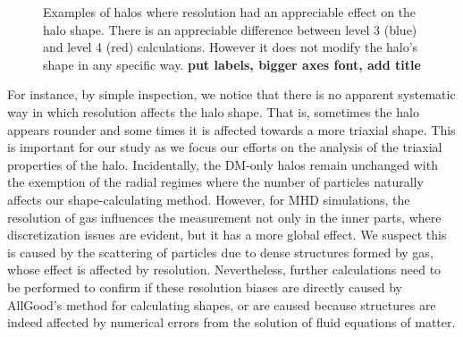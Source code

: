\begin{figure}[!ht]
  \centering
  \hfill
  \caption{Examples of halos where resolution had an appreciable effect on the halo shape. There is an appreciable difference between level 3 (blue) and level 4 (red) calculations. However it does not modify the halo's shape in any specific way. \textbf{put labels, bigger axes font, add title} }
\end{figure}


For instance, by simple inspection, we notice that there is no apparent systematic way in which resolution affects the halo shape. That is, sometimes the halo appears rounder and some times it is affected towards a more triaxial shape. This is important for our study as we focus our efforts on the analysis of the triaxial properties of the halo. Incidentally, the DM-only halos remain unchanged with the exemption of the radial regimes where the number of particles naturally affects our shape-calculating method. However, for MHD simulations, the resolution of gas influences the measurement not only in the inner parts, where discretization issues are evident, but it has a more global effect. We suspect this is caused by the scattering of particles due to dense structures formed by gas, whose effect is affected by resolution. Nevertheless, further calculations need to be performed to confirm if these resolution biases are directly caused by AllGood's method for calculating shapes, or are caused because structures are indeed affected by numerical errors from the solution of fluid equations of matter.\\

